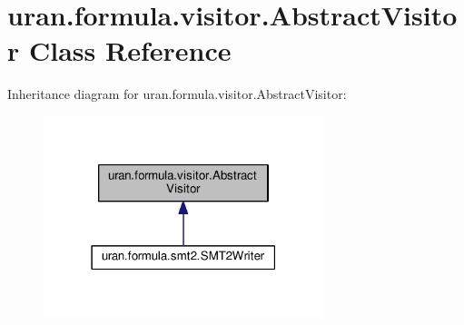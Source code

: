 \hypertarget{classuran_1_1formula_1_1visitor_1_1_abstract_visitor}{}\section{uran.\+formula.\+visitor.\+Abstract\+Visitor Class Reference}
\label{classuran_1_1formula_1_1visitor_1_1_abstract_visitor}


Inheritance diagram for uran.\+formula.\+visitor.\+Abstract\+Visitor\+:
\nopagebreak
\begin{figure}[H]
\begin{center}
\leavevmode
\includegraphics[width=231pt]{classuran_1_1formula_1_1visitor_1_1_abstract_visitor__inherit__graph}
\end{center}
\end{figure}
